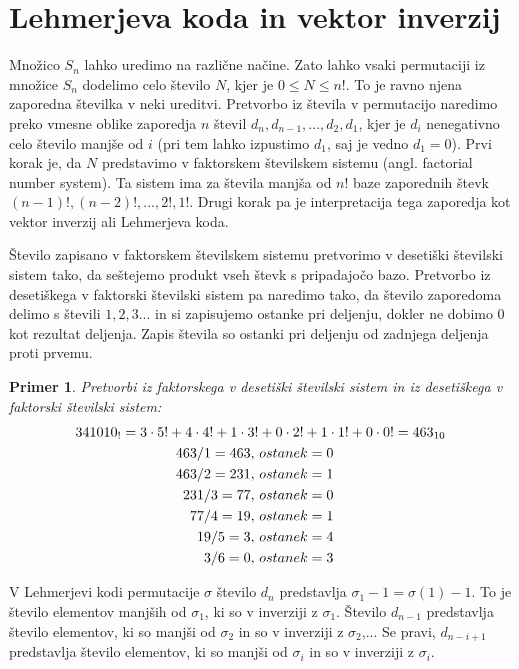 \documentclass[a4paper, 12pt]{book}
\newtheorem{primer}{Primer}[chapter]
\begin{document}
\section{ Lehmerjeva koda in vektor inverzij}
Množico $S_n$ lahko uredimo na različne načine. Zato lahko vsaki permutaciji iz množice $S_n$ dodelimo celo število $N$, kjer je $0 \leq N \leq n!$. To je ravno njena zaporedna številka v neki ureditvi. Pretvorbo iz števila v permutacijo naredimo preko vmesne oblike zaporedja $n$ števil $d_n,d_{n-1},...,d_2,d_1$, kjer je $d_i$ nenegativno celo število manjše od $i$ (pri tem lahko izpustimo $d_1$, saj je vedno $d_1 = 0$). Prvi korak je, da $N$ predstavimo v faktorskem številskem sistemu (angl. factorial number system). Ta sistem ima za števila manjša od $n!$ baze zaporednih števk $(n-1)!,(n-2)!,...,2!,1!$. Drugi korak pa je interpretacija tega zaporedja kot vektor inverzij ali Lehmerjeva koda.

Število zapisano v faktorskem številskem sistemu pretvorimo v desetiški številski sistem tako, da seštejemo produkt vseh števk s pripadajočo bazo. Pretvorbo iz desetiškega v faktorski številski sistem pa naredimo tako, da število zaporedoma delimo s števili $1, 2, 3...$ in si zapisujemo ostanke pri deljenju, dokler ne dobimo $0$ kot rezultat deljenja. Zapis števila so ostanki pri deljenju od zadnjega deljenja proti prvemu. 

\begin{primer}
Pretvorbi iz faktorskega v desetiški številski sistem in iz desetiškega v faktorski številski sistem: 
    \begin{align}
        341010_{!} = 3 \cdot 5! + 4 \cdot 4! + 1 \cdot 3&! + 0 \cdot 2! + 1 \cdot 1! + 0 \cdot 0! = 463_{10} \notag\\
        463 / 1 = 463,&\ ostanek = 0 \notag\\
        463 / 2 = 231,&\ ostanek = 1 \notag\\
        231 / 3 = 77,&\ ostanek = 0 \notag\\
        77 / 4 = 19,&\ ostanek = 1 \notag\\
        19 / 5 = 3,&\ ostanek = 4 \notag\\
        3 / 6 = 0,&\ ostanek = 3 \notag
    \end{align}
\end{primer}

V Lehmerjevi kodi permutacije $\sigma$ število $d_n$ predstavlja $\sigma_1 - 1 = \sigma(1) - 1$. To je število elementov manjših od $\sigma_1$, ki so v inverziji z $\sigma_1$. Število $d_{n-1}$ predstavlja število elementov, ki so manjši od $\sigma_2$ in so v inverziji z $\sigma_2$,... Se pravi, $d_{n-i+1}$ predstavlja število elementov, ki so manjši od $\sigma_i$ in so v inverziji z $\sigma_i$.
\end{document}
